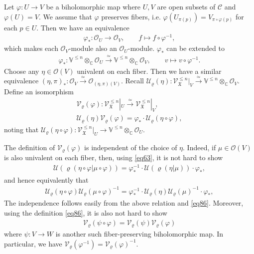 \documentclass[12pt,b5paper,notitlepage]{report}
\theoremstyle{definition}
\theoremstyle{plain}
\newcommand{\fk}{\mathfrak}
\newcommand{\mc}{\mathcal}
\newcommand{\scr}{\mathscr}
\newcommand{\Vbb}{\mathbb V}
\newcommand{\Cbb}{\mathbb C}
\numberwithin{equation}{section}
\begin{document}
Let $\varphi:U\rightarrow V$ be a biholomorphic map where $U,V$ are open subsets of $\mc C$ and $\varphi(U)=V$. We assume that $\varphi$ preserves fibers, i.e. $\varphi(U_{\pi(p)})=V_{\pi\circ\varphi(p)}$ for each $p\in U$. Then we have an  equivalence
\begin{gather*}
\varphi_*:\scr O_U\rightarrow\scr O_V,\qquad f\mapsto f\circ\varphi^{-1},
\end{gather*}
which makes each $\scr O_V$-module also an $\scr O_U$-module. $\varphi_*$ can be extended to
\begin{gather*}
\varphi_*:\Vbb^{\leq n}\otimes_{\Cbb}\scr O_U\xrightarrow{\simeq}\Vbb^{\leq n}\otimes_{\Cbb}\scr O_V,\qquad v\mapsto v\circ\varphi^{-1}.
\end{gather*}
Choose any $\eta\in\scr O(V)$ univalent on each fiber. Then we have a similar equivalence $(\eta,\pi)_*:\scr O_V\xrightarrow{\simeq}\scr O_{(\eta,\pi)(V)}$. Recall $\mc U_\varrho(\eta):\scr V_{\fk X}^{\leq n}|_V\xrightarrow{\simeq}\Vbb^{\leq n}\otimes_{\Cbb}\scr O_V$. Define an isomorphism \index{UV@$\mc U_\varrho(\eta),\mc U_\varrho(\varphi),\mc V_\varrho(\eta),\mc V_\varrho(\varphi)$}
\begin{gather}
\mc V_\varrho(\varphi):\scr V_{\fk X}^{\leq n}|_U\xrightarrow{\simeq} \scr V_{\fk X}^{\leq n}|_V,\nonumber\\
\mc U_\varrho(\eta)\mc V_\varrho(\varphi)=\varphi_*\cdot \mc U_\varrho(\eta\circ\varphi),\label{eq86}
\end{gather}
noting that $\mc U_\varrho(\eta\circ\varphi):\scr V_{\fk X}^{\leq n}|_U\rightarrow\Vbb^{\leq n}\otimes_{\Cbb}\scr O_U$. 

The definition of $\mc V_\varrho(\varphi)$ is independent of the choice of $\eta$. Indeed, if $\mu\in\scr O(V)$ is also univalent on each fiber, then, using \eqref{eq63}, it is not hard to show
\begin{align*}
\mc U(\varrho(\eta\circ\varphi|\mu\circ\varphi))=\varphi_*^{-1}\cdot\mc U(\varrho(\eta|\mu))\cdot\varphi_*,
\end{align*}
and hence equivalently that
\begin{align}
\mc U_\varrho(\eta\circ\varphi)\mc U_\varrho(\mu\circ\varphi)^{-1}=\varphi_*^{-1}\cdot\mc U_\varrho(\eta)\mc U_\varrho(\mu)^{-1}\cdot\varphi_*,
\end{align}
The independence follows easily from the above relation and \eqref{eq86}. Moreover, using the definition \eqref{eq86}, it is also not hard to show
\begin{align}
\mc V_\varrho(\psi\circ\varphi)=\mc V_\varrho(\psi)\mc V_\varrho(\varphi)
\end{align}
where $\psi:V\rightarrow W$ is another such fiber-preserving biholomorphic map. In particular, we have $\mc V_\varrho(\varphi^{-1})=\mc V_\varrho(\varphi)^{-1}$.
\end{document}
